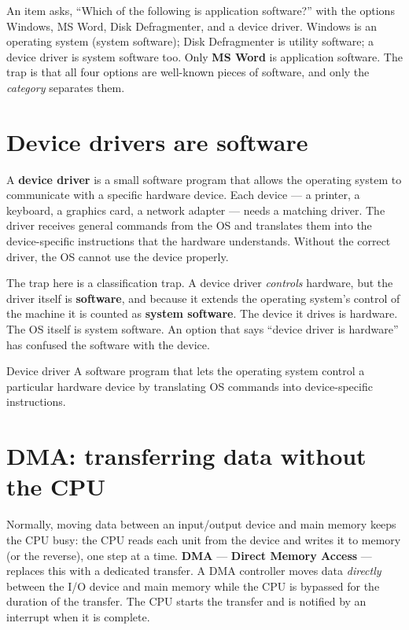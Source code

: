 \begin{example}
An item asks, ``Which of the following is application software?'' with the
options Windows, MS Word, Disk Defragmenter, and a device driver. Windows is
an operating system (system software); Disk Defragmenter is utility software;
a device driver is system software too. Only \textbf{MS Word} is application
software. The trap is that all four options are well-known pieces of
software, and only the \emph{category} separates them.
\end{example}

\section{Device drivers are software}
A \textbf{device driver} is a small software program that allows the
operating system to communicate with a specific hardware device. Each device
--- a printer, a keyboard, a graphics card, a network adapter --- needs a
matching driver. The driver receives general commands from the OS and
translates them into the device-specific instructions that the hardware
understands. Without the correct driver, the OS cannot use the device
properly.

The trap here is a classification trap. A device driver \emph{controls}
hardware, but the driver itself is \textbf{software}, and because it extends
the operating system's control of the machine it is counted as \textbf{system
software}. The device it drives is hardware. The OS itself is system
software. An option that says ``device driver is hardware'' has confused the
software with the device.

\begin{definitionbox}{Device driver}
A software program that lets the operating system control a particular
hardware device by translating OS commands into device-specific
instructions.
\end{definitionbox}

\section{DMA: transferring data without the CPU}
Normally, moving data between an input/output device and main memory keeps
the CPU busy: the CPU reads each unit from the device and writes it to memory
(or the reverse), one step at a time. \textbf{DMA} --- \textbf{Direct Memory
Access} --- replaces this with a dedicated transfer. A DMA controller moves
data \emph{directly} between the I/O device and main memory while the CPU is
bypassed for the duration of the transfer. The CPU starts the transfer and is
notified by an interrupt when it is complete.

